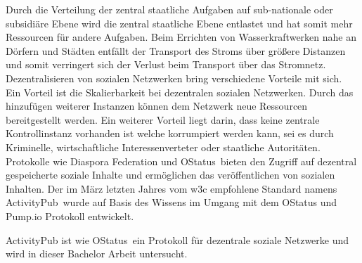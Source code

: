 {	Durch die Verteilung der zentral staatliche Aufgaben auf sub-nationale oder subsidiäre Ebene wird die zentral staatliche Ebene entlastet und hat somit mehr Ressourcen für andere Aufgaben. Beim Errichten von Wasserkraftwerken nahe an Dörfern und Städten entfällt der Transport des Stroms über größere Distanzen und somit verringert sich der Verlust beim Transport über das Stromnetz. Dezentralisieren von sozialen Netzwerken bring verschiedene Vorteile mit sich. Ein Vorteil ist die Skalierbarkeit bei dezentralen sozialen Netzwerken. Durch das hinzufügen weiterer Instanzen können dem Netzwerk neue Ressourcen bereitgestellt werden. Ein weiterer Vorteil liegt darin, dass keine zentrale Kontrollinstanz vorhanden ist welche korrumpiert werden kann, sei es durch Kriminelle, wirtschaftliche Interessenverteter oder staatliche Autoritäten.\\
	
	
	Protokolle wie \glqq Diaspora Federation und OStatus\grqq~bieten den Zugriff auf dezentral gespeicherte soziale Inhalte und ermöglichen das veröffentlichen von sozialen Inhalten. Der im März letzten Jahres vom \gls{w3c} empfohlene Standard namens \glqq ActivityPub\grqq~wurde auf Basis des Wissens im Umgang mit dem OStatus und Pump.io Protokoll entwickelt\cite{activityPub-acknowledgements}.\\ 
	
	ActivityPub ist wie \glqq OStatus\grqq~ein Protokoll für dezentrale soziale Netzwerke und wird in dieser Bachelor Arbeit untersucht.
}

